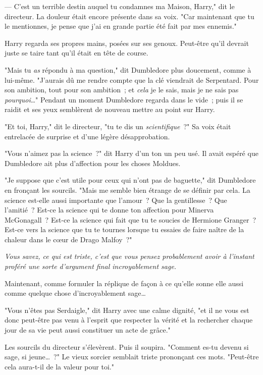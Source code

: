 --- C'est un terrible destin auquel tu condamnes ma Maison, Harry," dit le directeur. La douleur était encore présente dans sa voix. "Car maintenant que tu le mentionnes, je pense que j'ai en grande partie été fait par mes ennemis."

Harry regarda ses propres mains, posées sur ses genoux. Peut-être qu'il devrait juste se taire tant qu'il était en tête de course.

"Mais tu \emph{as} répondu à ma question," dit Dumbledore plus doucement, comme à lui-même. "J'aurais dû me rendre compte que la clé viendrait de Serpentard. Pour son ambition, tout pour son ambition~; et \emph{cela} je le sais, mais je ne sais pas \emph{pourquoi}…" Pendant un moment Dumbledore regarda dans le vide~; puis il se raidit et ses yeux semblèrent de nouveau mettre au point sur Harry.

"Et toi, Harry," dit le directeur, "tu te dis un \emph{scientifique}~?" Sa voix était entrelacée de surprise et d'une légère désapprobation.

"Vous n'aimez pas la science~?" dit Harry d'un ton un peu usé. Il avait espéré que Dumbledore ait plus d'affection pour les choses Moldues.

"Je suppose que c'est utile pour ceux qui n'ont pas de baguette," dit Dumbledore en fronçant les sourcils. "Mais me semble bien étrange de se définir par cela. La science est-elle aussi importante que l'amour~? Que la gentillesse~? Que l'amitié~? Est-ce la science qui te donne ton affection pour Minerva McGonagall~? Est-ce la science qui fait que tu te soucies de Hermione Granger~? Est-ce vers la science que tu te tournes lorsque tu essaies de faire naître de la chaleur dans le cœur de Drago Malfoy~?"

\emph{Vous savez, ce qui est triste, c'est que vous pensez probablement avoir à l'instant proféré une sorte d'argument final incroyablement sage.}

Maintenant, comme formuler la réplique de façon à ce qu'elle sonne elle aussi comme quelque chose d'incroyablement sage…

"Vous n'êtes pas Serdaigle," dit Harry avec une calme dignité, "et il ne vous est donc peut-être pas venu à l'esprit que respecter la vérité et la rechercher chaque jour de sa vie peut aussi constituer un acte de grâce."

Les sourcils du directeur s'élevèrent. Puis il soupira. "Comment es-tu devenu si sage, si jeune…~?" Le vieux sorcier semblait triste prononçant ces mots. "Peut-être cela aura-t-il de la valeur pour toi."

